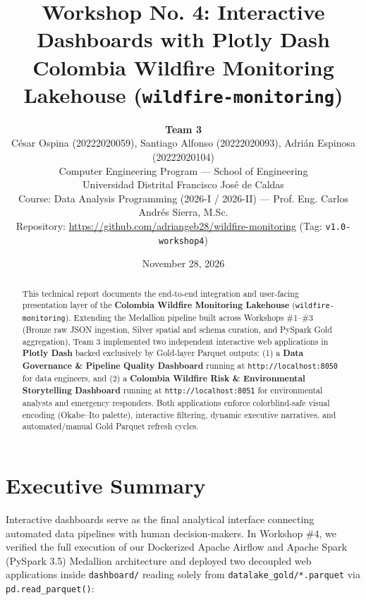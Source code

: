 \documentclass[11pt,a4paper]{article}
\title{
    \vspace{-1.0cm}
    \textbf{\Large Workshop No. 4: Interactive Dashboards with Plotly Dash} \\
    \vspace{0.2cm}
    \large Colombia Wildfire Monitoring Lakehouse (\texttt{wildfire-monitoring})
}
\author{
    \normalsize \textbf{Team 3} \\
    \normalsize C\'esar Ospina (20222020059), Santiago Alfonso (20222020093), Adri\'an Espinosa (20222020104) \\
    \normalsize Computer Engineering Program --- School of Engineering \\
    \normalsize Universidad Distrital Francisco Jos\'e de Caldas \\
    \normalsize Course: Data Analysis Programming (2026-I / 2026-II) --- Prof. Eng. Carlos Andr\'es Sierra, M.Sc. \\
    \normalsize Repository: \url{https://github.com/adriangeb28/wildfire-monitoring} \quad (Tag: \texttt{v1.0-workshop4})
}
\date{November 28, 2026}
\begin{document}
\maketitle

\begin{abstract}
This technical report documents the end-to-end integration and user-facing presentation layer of the \textbf{Colombia Wildfire Monitoring Lakehouse} (\texttt{wildfire-monitoring}). Extending the Medallion pipeline built across Workshops \#1--\#3 (Bronze raw JSON ingestion, Silver spatial and schema curation, and PySpark Gold aggregation), Team 3 implemented two independent interactive web applications in \textbf{Plotly Dash} backed exclusively by Gold-layer Parquet outputs: (1) a \textbf{Data Governance \& Pipeline Quality Dashboard} running at \texttt{http://localhost:8050} for data engineers, and (2) a \textbf{Colombia Wildfire Risk \& Environmental Storytelling Dashboard} running at \texttt{http://localhost:8051} for environmental analysts and emergency responders. Both applications enforce colorblind-safe visual encoding (Okabe--Ito palette), interactive filtering, dynamic executive narratives, and automated/manual Gold Parquet refresh cycles.
\end{abstract}

\section{Executive Summary}

Interactive dashboards serve as the final analytical interface connecting automated data pipelines with human decision-makers. In Workshop \#4, we verified the full execution of our Dockerized Apache Airflow and Apache Spark (PySpark 3.5) Medallion architecture and deployed two decoupled web applications inside \texttt{dashboard/} reading solely from \texttt{datalake\_gold/*.parquet} via \texttt{pd.read\_parquet()}:
\end{document}
